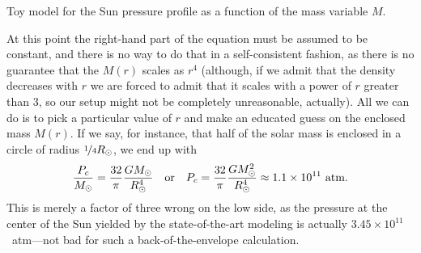 \begin{marginfigure}
	
	\caption{Toy model for the Sun pressure profile as a function of the mass variable
	$M$.}
\end{marginfigure}

At this point the right-hand part of the equation must be assumed to be constant,
and there is no way to do that in a self-consistent fashion, as there is no guarantee
that the $M(r)$ scales as $r^4$ (although, if we admit that the density decreases
with $r$ we are forced to admit that it scales with a power of $r$ greater than 3,
so our setup might not be completely unreasonable, actually). All we can do is to pick
a particular value of $r$ and make an educated guess on the enclosed mass $M(r)$.
If we say, for instance, that half of the solar mass is enclosed in a circle of radius
$\nicefrac{1}{4} R_\odot$, we end up with
\begin{align*}
    \frac{P_c}{M_\odot} = \frac{32}{\pi} \frac{G M_\odot}{R_\odot^4}
	  \quad\text{or}\quad
    P_c = \frac{32}{\pi} \frac{G M_\odot^2}{R_\odot^4}
		\approx 1.1 \times 10^{11}~\text{atm}.
\end{align*}
This is merely a factor of three wrong on the low side, as the pressure at the
center of the Sun yielded by the state-of-the-art modeling is actually
$3.45 \times 10^{11}$~atm---not bad for such a back-of-the-envelope calculation.


